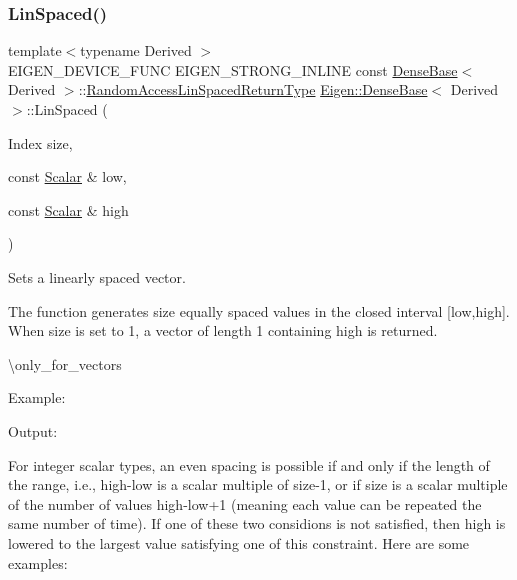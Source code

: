 \subsubsection{\texorpdfstring{LinSpaced()}{LinSpaced()}\hspace{0.1cm}{\footnotesize\ttfamily [2/4]}}
{\footnotesize\ttfamily template$<$typename Derived $>$ \\
E\+I\+G\+E\+N\+\_\+\+D\+E\+V\+I\+C\+E\+\_\+\+F\+U\+NC E\+I\+G\+E\+N\+\_\+\+S\+T\+R\+O\+N\+G\+\_\+\+I\+N\+L\+I\+NE const \mbox{\hyperlink{class_eigen_1_1_dense_base}{Dense\+Base}}$<$ Derived $>$\+::\mbox{\hyperlink{class_eigen_1_1_cwise_nullary_op}{Random\+Access\+Lin\+Spaced\+Return\+Type}} \mbox{\hyperlink{class_eigen_1_1_dense_base}{Eigen\+::\+Dense\+Base}}$<$ Derived $>$\+::Lin\+Spaced (\begin{DoxyParamCaption}\item[{Index}]{size,  }\item[{const \mbox{\hyperlink{class_eigen_1_1_dense_base_a5feed465b3a8e60c47e73ecce83e39a2}{Scalar}} \&}]{low,  }\item[{const \mbox{\hyperlink{class_eigen_1_1_dense_base_a5feed465b3a8e60c47e73ecce83e39a2}{Scalar}} \&}]{high }\end{DoxyParamCaption})\hspace{0.3cm}{\ttfamily [static]}}



Sets a linearly spaced vector. 

The function generates \textquotesingle{}size\textquotesingle{} equally spaced values in the closed interval \mbox{[}low,high\mbox{]}. When size is set to 1, a vector of length 1 containing \textquotesingle{}high\textquotesingle{} is returned.

\textbackslash{}only\+\_\+for\+\_\+vectors

Example\+: 
\begin{DoxyCodeInclude}{0}
\end{DoxyCodeInclude}
 Output\+: 
\begin{DoxyVerbInclude}
\end{DoxyVerbInclude}


For integer scalar types, an even spacing is possible if and only if the length of the range, i.\+e., {\ttfamily high-\/low} is a scalar multiple of {\ttfamily size-\/1}, or if {\ttfamily size} is a scalar multiple of the number of values {\ttfamily high-\/low+1} (meaning each value can be repeated the same number of time). If one of these two considions is not satisfied, then {\ttfamily high} is lowered to the largest value satisfying one of this constraint. Here are some examples\+:

